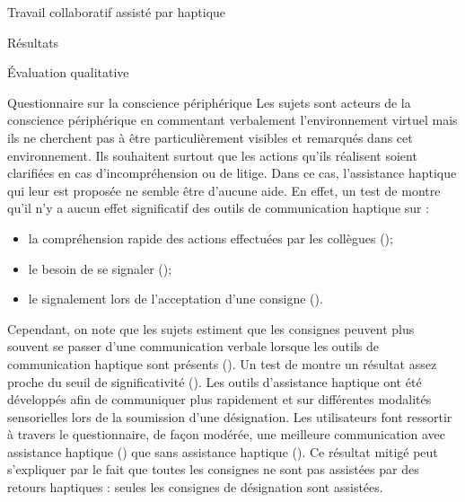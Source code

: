 \documentclass[myfrancais,ngerman,english,frenchb]{mythesis}
\begin{document}
\begin{mychapter}{Travail collaboratif assisté par haptique}
\begin{mysection}{Résultats}
\begin{mysubsection}{Évaluation qualitative}
\begin{mysubsubsection}{Questionnaire sur la conscience périphérique}
					Les sujets sont acteurs de la conscience périphérique en commentant verbalement l'environnement virtuel mais ils ne cherchent pas à être particulièrement visibles et remarqués dans cet environnement.
					Ils souhaitent surtout que les actions qu'ils réalisent soient clarifiées en cas d'incompréhension ou de litige.
					Dans ce cas, l'assistance haptique qui leur est proposée ne semble être d'aucune aide.
					En effet, un test de  montre qu'il n'y a aucun effet significatif des outils de communication haptique sur :
					\begin{itemize}
						\item la compréhension rapide des actions effectuées par les collègues ();
						\item le besoin de se signaler ();
						\item le signalement lors de l'acceptation d'une consigne ().
					\end{itemize}

					Cependant, on note que les sujets estiment que les consignes peuvent plus souvent se passer d'une communication verbale lorsque les outils de communication haptique sont présents ().
					Un test de  montre un résultat assez proche du seuil de significativité ().
					Les outils d'assistance haptique ont été développés afin de communiquer plus rapidement et sur différentes modalités sensorielles lors de la soumission d'une désignation.
					Les utilisateurs font ressortir à travers le questionnaire, de façon modérée, une meilleure communication avec assistance haptique () que sans assistance haptique ().
					Ce résultat mitigé peut s'expliquer par le fait que toutes les consignes ne sont pas assistées par des retours haptiques : seules les consignes de désignation sont assistées.


\end{mysubsubsection}
\end{mysubsection}
\end{mysection}
\end{mychapter}
\end{document}
